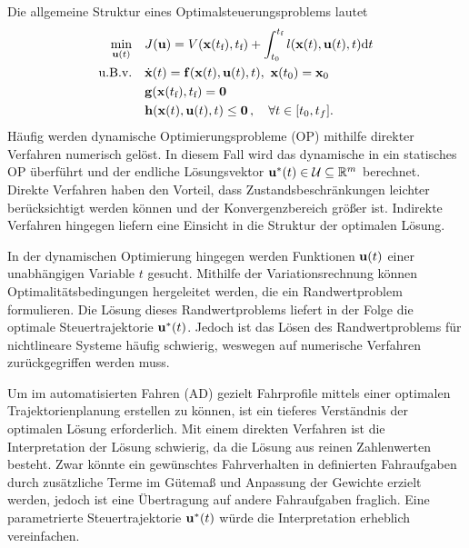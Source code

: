 Die allgemeine Struktur eines Optimalsteuerungsproblems lautet
%
\begin{equation*} \begin{aligned}
		\min\limits_{\boldsymbol{\mathrm{u}}(t)} \ \ \ & J(\boldsymbol{\mathrm{u}})=V(\boldsymbol{\mathrm{x}}(t_\text{f}),t_\text{f}) + \int_{t_0}^{t_\text{f}}l(\boldsymbol{\mathrm{x}}(t),\boldsymbol{\mathrm{u}}(t),t)\text{d}t \\
		\text{u.B.v.} \ \ \ & \dot{\boldsymbol{\mathrm{x}}}(t)=\boldsymbol{\mathrm{f}}(\boldsymbol{\mathrm{x}}(t),\boldsymbol{\mathrm{u}}(t),t), \ \boldsymbol{\mathrm{x}}(t_0)=\boldsymbol{\mathrm{x}}_0\\ 
		& \mathbf{g}(\boldsymbol{\mathrm{x}}(t_\text{f}),t_\text{f}) = \boldsymbol{\mathrm{0}} \\
		& \mathbf{h}(\boldsymbol{\mathrm{x}}(t),\boldsymbol{\mathrm{u}}(t),t) \leq \boldsymbol{\mathrm{0}} \,,\quad \forall t \in [t_0, t_f].
\end{aligned} \end{equation*}
%
Häufig werden dynamische Optimierungsprobleme (OP) mithilfe direkter Verfahren numerisch gelöst. 
In diesem Fall wird das dynamische in ein statisches OP überführt und der endliche Lösungsvektor ${\boldsymbol{\mathrm{u}}}^*(t) \in \mathcal{U} \subseteq \mathbb{R}^m$ berechnet. 
Direkte Verfahren haben den Vorteil, dass Zustandsbeschränkungen leichter berücksichtigt werden können und der Konvergenzbereich größer ist. 
Indirekte Verfahren hingegen liefern eine Einsicht in die Struktur der optimalen Lösung.

In der dynamischen Optimierung hingegen werden Funktionen $\boldsymbol{\mathrm{u}}(t)$ einer unabhängigen Variable $t$ gesucht. 
Mithilfe der Variationsrechnung können Optimalitätsbedingungen hergeleitet werden, die ein Randwertproblem formulieren. 
Die Lösung dieses Randwertproblems liefert in der Folge die optimale Steuertrajektorie ${\boldsymbol{\mathrm{u}}}^*(t)$. 
Jedoch ist das Lösen des Randwertproblems für nichtlineare Systeme häufig schwierig, weswegen auf numerische Verfahren zurückgegriffen werden muss.

Um im automatisierten Fahren (AD) gezielt Fahrprofile mittels einer optimalen Trajektorienplanung erstellen zu können, ist ein tieferes Verständnis der optimalen Lösung erforderlich. 
Mit einem direkten Verfahren ist die Interpretation der Lösung schwierig, da die Lösung aus reinen Zahlenwerten besteht. 
Zwar könnte ein gewünschtes Fahrverhalten in definierten Fahraufgaben durch zusätzliche Terme im Gütemaß und Anpassung der Gewichte erzielt werden, jedoch ist eine Übertragung auf andere Fahraufgaben fraglich. 
Eine parametrierte Steuertrajektorie ${\boldsymbol{\mathrm{u}}}^*(t)$ würde die Interpretation erheblich vereinfachen.


